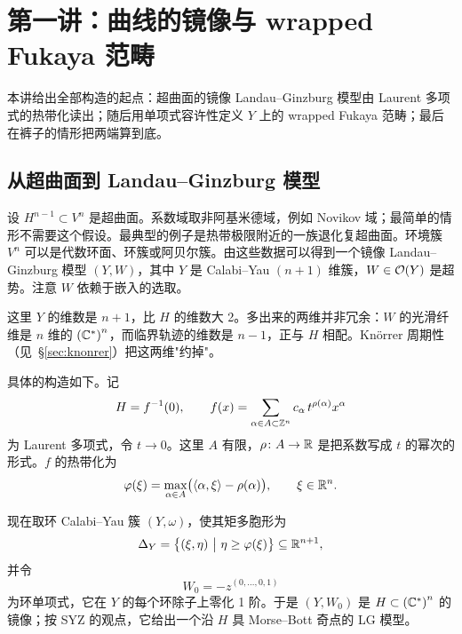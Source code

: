 \section{第一讲：曲线的镜像与 wrapped Fukaya 范畴}

本讲给出全部构造的起点：超曲面的镜像 Landau--Ginzburg 模型由 Laurent 多项式的热带化读出；随后用单项式容许性定义 $Y$ 上的 wrapped Fukaya 范畴；最后在裤子的情形把两端算到底。

\subsection{从超曲面到 Landau--Ginzburg 模型}

设 $H^{n-1}\subset V^n$ 是超曲面。系数域取非阿基米德域，例如 Novikov 域；最简单的情形不需要这个假设。最典型的例子是热带极限附近的一族退化复超曲面。环境簇 $V^n$ 可以是代数环面、环簇或阿贝尔簇。由这些数据可以得到一个镜像 Landau--Ginzburg 模型 $(Y,W)$，其中 $Y$ 是 Calabi--Yau $(n+1)$ 维簇，$W\in\mathcal{O}(Y)$ 是超势。注意 $W$ 依赖于嵌入的选取。

\begin{remark}
这里 $Y$ 的维数是 $n+1$，比 $H$ 的维数大 2。多出来的两维并非冗余：$W$ 的光滑纤维是 $n$ 维的 $\left(\mathbb{C}^*\right)^n$，而临界轨迹的维数是 $n-1$，正与 $H$ 相配。Knörrer 周期性（见~\S\ref{sec:knonrer}）把这两维"约掉"。
\end{remark}

具体的构造如下。记
\[
H=f^{-1}(0),\qquad
f(x)=\sum_{\alpha\in A\subset\mathbb{Z}^n} c_\alpha\, t^{\rho(\alpha)} x^\alpha
\]
为 Laurent 多项式，令 $t\to 0$。这里 $A$ 有限，$\rho\colon A\to\mathbb{R}$ 是把系数写成 $t$ 的幂次的形式。$f$ 的热带化为
\begin{equation}
\varphi(\xi)=\max_{\alpha\in A}\bigl(\langle\alpha,\xi\rangle-\rho(\alpha)\bigr),
\qquad \xi\in\mathbb{R}^n .
\label{eq:trop}
\end{equation}

现在取环 Calabi--Yau 簇 $(Y,\omega)$，使其矩多胞形为
\[
\Delta_Y=\bigl\{(\xi,\eta)\ \bigl|\ \eta\ge\varphi(\xi)\bigr\}\subseteq\R^{n+1},
\]
并令
\[
W_0=-z^{(0,\dots,0,1)}
\]
为环单项式，它在 $Y$ 的每个环除子上零化 1 阶。于是 $(Y,W_0)$ 是 $H\subset\left(\mathbb{C}^*\right)^n$ 的镜像；按 SYZ 的观点，它给出一个沿 $H$ 具 Morse--Bott 奇点的 LG 模型。

